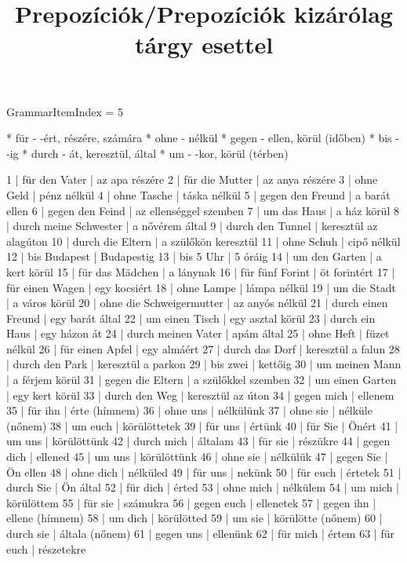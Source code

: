\begin{exmp}
\end{exmp}

\title{Prepozíciók/Prepozíciók kizárólag tárgy esettel}

GrammarItemIndex = 5

\begin{desc}
* für - -ért, részére, számára
* ohne - nélkül
* gegen - ellen, körül (időben)
* bis - -ig
* durch - át, keresztül, által
* um - -kor, körül (térben)
\end{desc}

\begin{exmp}
1 | für den Vater | az apa részére
2 | für die Mutter | az anya részére
3 | ohne Geld | pénz nélkül
4 | ohne Tasche | táska nélkül
5 | gegen den Freund | a barát ellen
6 | gegen den Feind | az ellenséggel szemben
7 | um das Haus | a ház körül
8 | durch meine Schwester | a nővérem által
9 | durch den Tunnel | keresztül az alagúton
10 | durch die Eltern | a szülőkön keresztül
11 | ohne Schuh | cipő nélkül
12 | bis Budapest | Budapestig
13 | bis 5 Uhr | 5 óráig
14 | um den Garten | a kert körül
15 | für das Mädchen | a lánynak
16 | für fünf Forint | öt forintért
17 | für einen Wagen | egy kocsiért
18 | ohne Lampe | lámpa nélkül
19 | um die Stadt | a város körül
20 | ohne die Schweigermutter | az anyós nélkül
21 | durch einen Freund | egy barát által
22 | um einen Tisch | egy asztal körül
23 | durch ein Haus | egy házon át
24 | durch meinen Vater | apám által
25 | ohne Heft | füzet nélkül
26 | für einen Apfel | egy almáért
27 | durch das Dorf | keresztül a falun
28 | durch den Park | keresztül a parkon
29 | bis zwei | kettőig
30 | um meinen Mann | a férjem körül
31 | gegen die Eltern | a szülőkkel szemben
32 | um einen Garten | egy kert körül
33 | durch den Weg | keresztül az úton
34 | gegen mich | ellenem
35 | für ihn | érte (hímnem)
36 | ohne uns | nélkülünk
37 | ohne sie | nélküle (nőnem)
38 | um euch | körülöttetek
39 | für uns | értünk
40 | für Sie | Önért
41 | um uns | körülöttünk
42 | durch mich | általam
43 | für sie | részükre
44 | gegen dich | ellened
45 | um uns | körülöttünk
46 | ohne sie | nélkülük
47 | gegen Sie | Ön ellen
48 | ohne dich | nélküled
49 | für uns | nekünk
50 | für euch | értetek
51 | durch Sie | Ön által
52 | für dich | érted
53 | ohne mich | nélkülem
54 | um mich | körülöttem
55 | für sie | számukra
56 | gegen euch | ellenetek
57 | gegen ihn | ellene (hímnem)
58 | um dich | körülötted
59 | um sie | körülötte (nőnem)
60 | durch sie | általa (nőnem)
61 | gegen uns | ellenünk
62 | für mich | értem
63 | für euch | részetekre
\end{exmp}

